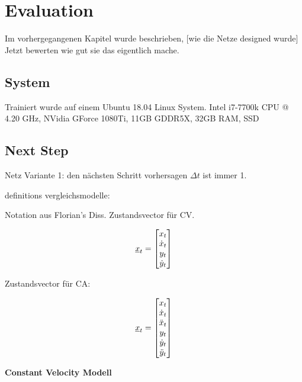 \chapter{Evaluation}

Im vorhergegangenen Kapitel wurde beschrieben, [wie die Netze designed wurde]
Jetzt bewerten wie gut sie das eigentlich mache.

\section{System}

Trainiert wurde auf einem Ubuntu 18.04 Linux System.
Intel i7-7700k CPU @ 4.20 GHz,
NVidia GForce 1080Ti, 11GB GDDR5X,
32GB RAM,
SSD 


\section{Next Step}

Netz Variante 1: den nächsten Schritt vorhersagen
\(\Delta t \) ist immer 1.

definitions vergleichsmodelle:

Notation aus Florian's Diss. Zustandsvector für CV.


\begin{equation*} \label{eq:definitionCV}
    {\underline{x}}_t = 
    \begin{bmatrix}
        x_t \\
        \dot{x}_t \\
        y_t \\
        \dot{y}_t
       \end{bmatrix} 
\end{equation*}


Zustandsvector für CA:

\begin{equation*} \label{eq:definitionCA}
    {\underline{x}}_t = 
    \begin{bmatrix}
        x_t \\
        \dot{x}_t \\
        \ddot{x}_t \\
        y_t \\
        \dot{y}_t \\
        \ddot{y}_t
       \end{bmatrix} 
\end{equation*}


\textbf{Constant Velocity Modell}

